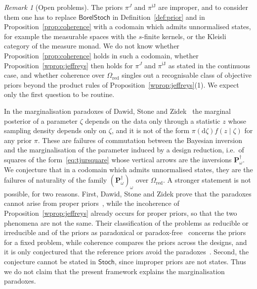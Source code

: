\documentclass[11pt,a4paper]{article}
\theoremstyle{plain}
\theoremstyle{definition}
\theoremstyle{remark}
\newtheorem{remark}[theorem]{Remark}
\newcommand{\cat}[1]{\mathsf{#1}}
\newcommand{\catO}{\cat{\Omega}}
\newcommand{\Stoch}{\cat{Stoch}}
\newcommand{\BorelStoch}{\cat{BorelStoch}}
\begin{document}
\begin{remark}[Open problems]\label{rem:open}
The priors $\pi^{J}$ and $\pi^{\mathrm{iJ}}$ are improper, and to consider them
one has to replace $\BorelStoch$ in Definition~\ref{def:prior} and in
Proposition~\ref{prop:coherence} with a codomain which admits unnormalised
states, for example the measurable spaces with the $s$-finite kernels, or the
Kleisli category of the measure monad. We do not know whether
Proposition~\ref{prop:coherence} holds in such a codomain, whether
Proposition~\ref{wprop:jeffreys} then holds for $\pi^{J}$ and
$\pi^{\mathrm{iJ}}$ as stated in the continuous case, and whether coherence
over $\catO_{\mathrm{red}}$ singles out a recognisable class of objective
priors beyond the product rules of Proposition~\ref{wprop:jeffreys}(1). We
expect only the first question to be routine.

In the marginalisation paradoxes of Dawid, Stone and
Zidek~\cite[\S1 and Thm.~2.1, p.~198]{dawid_stone_zidek_1973} the marginal
posterior of a parameter $\zeta$ depends on the data only through a statistic
$z$ whose sampling density depends only on $\zeta$, and it is not of the form
$\pi(\mathrm{d}\zeta)f(z\mid\zeta)$ for any prior $\pi$. These are failures of
commutation between the Bayesian inversion and the marginalisation of the
parameter induced by a design reduction, i.e.\ of squares of the
form~\eqref{eq:tjursquare} whose vertical arrows are the inversions
$\mathbf P^{\dagger}_{\omega}$. We conjecture that in a codomain which admits
unnormalised states, they are the failures of naturality of the family
$(\mathbf P^{\dagger}_{\omega})_{\omega}$ over $\catO_{\mathrm{red}}$. A
stronger statement is not possible, for two reasons. First, Dawid, Stone and
Zidek prove that the paradoxes cannot arise from proper
priors~\cite[p.~189 and p.~194, eqs.~(1.20)--(1.23)]{dawid_stone_zidek_1973},
while the incoherence of Proposition~\ref{wprop:jeffreys} already occurs for
proper priors, so that the two phenomena are not the same. Their
classification of the problems as reducible or irreducible and of the priors
as paradoxical or
paradox-free~\cite[p.~208]{dawid_stone_zidek_1973} concerns the priors for a
fixed problem, while coherence compares the priors across the designs, and it
is only conjectured that the reference priors avoid the
paradoxes~\cite[p.~123]{bernardo_reference_1979}. Second, the conjecture
cannot be stated in $\Stoch$, since improper priors are not states. Thus we do
not claim that the present framework explains the marginalisation paradoxes.
\end{remark}
\end{document}

